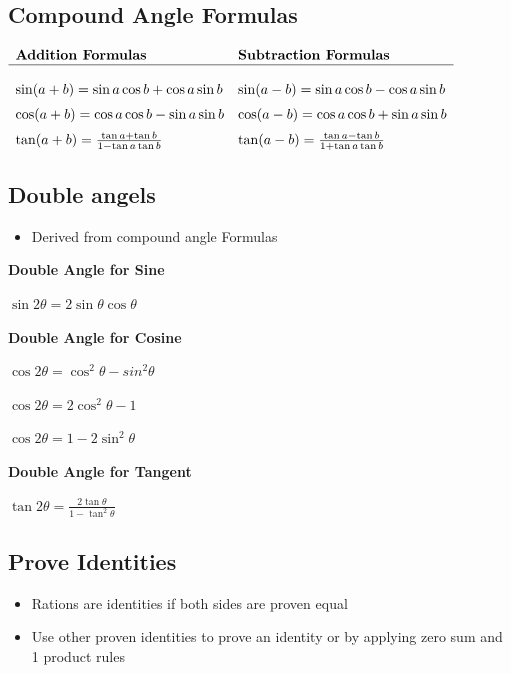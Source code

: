 \documentclass{article}
\begin{document}
    \subsection{Compound Angle Formulas}
    $
    \begin{array}{ll}
        \textbf{Addition Formulas} & \textbf{Subtraction Formulas} \\
        \hline \\
        \sin (a+b) = \sin a \cos b + \cos a \sin b & \sin (a-b) = \sin a \cos b - \cos a \sin b \\[0.2 cm]
        \cos (a + b) = \cos a \cos b - \sin a \sin b & \cos (a-b) = \cos a \cos b + \sin a \sin b \\[0.2 cm]
        \tan (a+b) = \frac{\tan a + \tan b}{1 - \tan a \tan b} & \tan(a-b) = \frac{\tan a  - \tan b}{1 + \tan a \tan b}
    \end{array}
    $

    \subsection{Double angels}
    \begin{itemize}
        \item Derived from compound angle Formulas
    \end{itemize}
    
    \textbf{Double Angle for Sine}

    $\sin 2 \theta = 2 \sin \theta \cos \theta$

    \textbf{Double Angle for Cosine}

    $\cos 2 \theta = \cos^2 \theta - sin^2 \theta$

    $\cos 2 \theta = 2 \cos^2 \theta - 1$

    $\cos 2 \theta = 1 - 2 \sin^2 \theta$

    \textbf{Double Angle for Tangent}

    $\tan 2 \theta = \frac{2 \tan \theta}{1 - \tan^2 \theta}$

    \subsection{Prove Identities}
    \begin{itemize}
        \item Rations are identities if both sides are proven equal
        \item Use other proven identities to prove an identity or by applying zero sum and 1 product rules
    \end{itemize}
\end{document}
